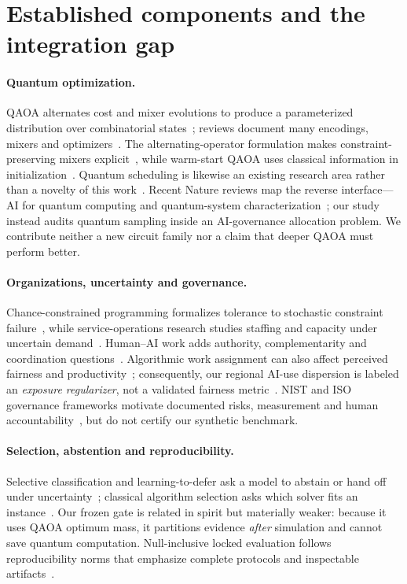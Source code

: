 \section{Established components and the integration gap}
\label{sec:related}

\paragraph{Quantum optimization.}
QAOA alternates cost and mixer evolutions to produce a parameterized distribution over combinatorial states~\citep{farhi2014qaoa,zhou2020qaoa}; reviews document many encodings, mixers and optimizers~\citep{blekos2024review,sawaya2023mixers}. The alternating-operator formulation makes constraint-preserving mixers explicit~\citep{hadfield2019alternating}, while warm-start QAOA uses classical information in initialization~\citep{egger2021warm}. Quantum scheduling is likewise an existing research area rather than a novelty of this work~\citep{werner2026scheduling}. Recent Nature reviews map the reverse interface---AI for quantum computing and quantum-system characterization~\citep{artificialintelligence2025quantum,mehta2026representing}; our study instead audits quantum sampling inside an AI-governance allocation problem. We contribute neither a new circuit family nor a claim that deeper QAOA must perform better.

\paragraph{Organizations, uncertainty and governance.}
Chance-constrained programming formalizes tolerance to stochastic constraint failure~\citep{charnes1959chance}, while service-operations research studies staffing and capacity under uncertain demand~\citep{gans2003callcenters}. Human--AI work adds authority, complementarity and coordination questions~\citep{amershi2019humanai,seeber2020machines,fuegener2026complementarity}. Algorithmic work assignment can also affect perceived fairness and productivity~\citep{bai2022algorithmic}; consequently, our regional AI-use dispersion is labeled an \emph{exposure regularizer}, not a validated fairness metric~\citep{selbst2019fairness,mehrabi2021fairness}. NIST and ISO governance frameworks motivate documented risks, measurement and human accountability~\citep{nist2023airmf,iso42001,iso23894}, but do not certify our synthetic benchmark.

\paragraph{Selection, abstention and reproducibility.}
Selective classification and learning-to-defer ask a model to abstain or hand off under uncertainty~\citep{geifman2017selective,madras2018defer}; classical algorithm selection asks which solver fits an instance~\citep{rice1976algorithm,kotthoff2014algorithm}. Our frozen gate is related in spirit but materially weaker: because it uses QAOA optimum mass, it partitions evidence \emph{after} simulation and cannot save quantum computation. Null-inclusive locked evaluation follows reproducibility norms that emphasize complete protocols and inspectable artifacts~\citep{pineau2021reproducibility}.

